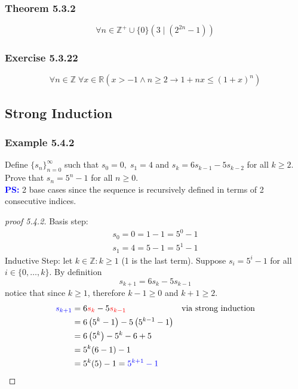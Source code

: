 \documentclass[12pt]{book}
\newcommand{\Z}{\mathbb{Z}}
\newcommand{\R}{\mathbb{R}}
\newcommand{\paren}[1]{\left( #1 \right)}
\newcommand{\nonneg}{\Z^+ \cup \{0\}}
\begin{document}
\subsubsection{Theorem 5.3.2}
\[
\forall n \in \nonneg \paren{3 \mid \paren{2^{2n}-1}}
\]

\subsubsection{Exercise 5.3.22}
\[
\forall n \in \Z \; \forall x \in \R \paren{
x > -1 \wedge n \geq 2 \rightarrow 1 + nx \leq (1+x)^n
}
\]

\subsection{Strong Induction}
\subsubsection{Example 5.4.2}
Define $\{  s_n \}_{n=0}^{\infty}$ such that $s_0 = 0, \; s_1 =4$ and $s_k = 6s_{k-1}-5s_{k-2}$ for all $k \geq 2$. Prove that $s_n = 5^n-1$ for all $n \geq 0$.\\
\textcolor{blue}{\textbf{PS:}} 2 base cases since the sequence is recursively defined in terms of 2 consecutive indices. 
\begin{proof}[proof 5.4.2]

    Basis step:
    \begin{align*}
    s_0 = 0 = 1-1 = 5^0 -1\\
    s_1 = 4 = 5-1 = 5^1 - 1
    \end{align*}
    Inductive Step: let $k \in \Z : k \geq 1$ (1 is the last term). Suppose $s_i = 5^i -1$ for all $ i \in \{ 0,\ldots ,k  \}$. By definition
    \[
    s_{k+1} = 6s_k - 5s_{k-1}
    \]
    notice that since $k \geq 1$, therefore $k-1 \geq 0$ and $k + 1 \geq 2$. 
    \begin{align*}
        \textcolor{blue}{s_{k+1}} 
        &= 6\textcolor{red}{s_k }- 5\textcolor{red}{s_{k-1}} & \text{via strong induction}\\
        &= 6\paren{5^k-1} - 5\paren{5^{k-1}-1}\\
        &= 6\paren{5^k} - 5^k - 6 + 5 \\
        &= 5^k ( 6-1) -1\\
        &= 5^k(5)-1 = \textcolor{blue}{ 5^{k+1}-1}
    \end{align*}
    
\end{proof}
\end{document}
